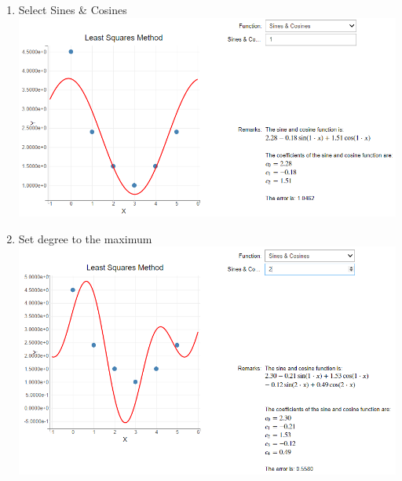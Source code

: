 {\begin{enumerate}
    \item Select Sines \& Cosines\\
    \includegraphics[scale=0.6]{Include/Images/Thesis/Documentation/Visualizers/LeastSquares/Example 3/Example 3 - 00 - Trigonometry.png}
    \item Set degree to the maximum\\
    \includegraphics[scale=0.6]{Include/Images/Thesis/Documentation/Visualizers/LeastSquares/Example 3/Example 3 - 01 - Trigonometry Degree 2.png}
\end{enumerate}
}
